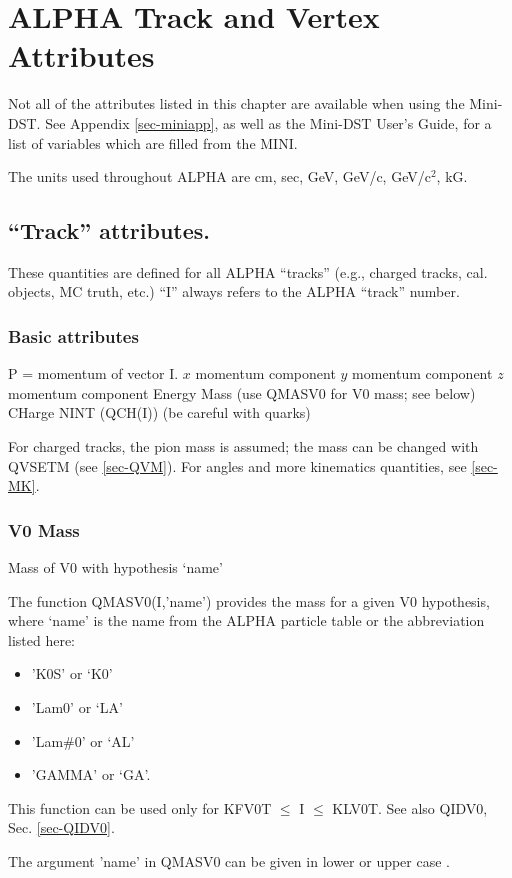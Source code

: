 \chapter{\label{sec-TVA}ALPHA Track and Vertex Attributes}
\par
Not all of the attributes listed in this chapter are available
when using the Mini-DST.  See Appendix \ref{sec-miniapp}, as well as
the
Mini-DST User's Guide, for a list of variables which are filled
from the MINI.
\par
The units used throughout
ALPHA are cm, sec, GeV, GeV/c, GeV/c$^2$, kG.
\par
\section{\label{sec-TVATA}``Track'' attributes.}
\par
These quantities are defined for all ALPHA ``tracks'' (e.g., charged
tracks, cal.
objects, MC truth, etc.) ``I'' always refers to the ALPHA ``track''
number.
 
\subsection{\label{sec-TVABA}Basic attributes}
\par
\begin{indentlist}{ 2.00cm}{ 2.25cm}
P = momentum of vector I.
$x$ momentum component
$y$ momentum component
$z$ momentum component
Energy
Mass (use QMASV0 for V0 mass; see below)
CHarge
NINT (QCH(I)) (be careful with quarks)
\end{indentlist}
For charged tracks, the pion mass is assumed; the mass can be changed
with QVSETM (see \ref{sec-QVM}).
For angles and more kinematics quantities, see \ref{sec-MK}.
 
\subsection{\label{sec-TVAV0M}V0 Mass}
\par
\begin{indentlist}{ 3.00cm}{ 3.25cm}
Mass of V0 with hypothesis `name'
\end{indentlist}
The function QMASV0(I,'name') provides the mass for a given V0
hypothesis, where `name' is the name from the ALPHA particle table
or the abbreviation listed here:
\begin{itemize}
\item 'K0S' or  `K0'
\item 'Lam0' or `LA'
\item 'Lam\#0' or `AL'
\item 'GAMMA' or `GA'.
\end{itemize}
This function can be used only for KFV0T $
\leq
$ I $
\leq
$ KLV0T.
See also QIDV0, Sec. \ref{sec-QIDV0}.
\par
 The argument 'name' in QMASV0 can be given in lower or upper case .
